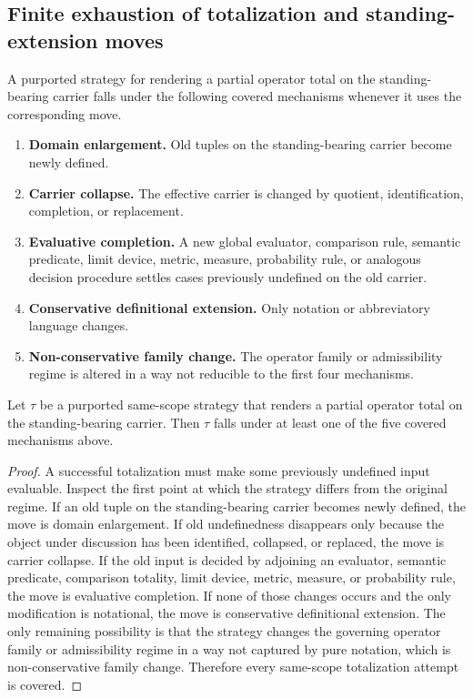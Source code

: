 \subsection{Finite exhaustion of totalization and standing-extension moves}

\begin{definition}
A purported strategy for rendering a partial operator total on the standing-bearing carrier falls under the following covered mechanisms whenever it uses the corresponding move.
\begin{enumerate}
  \item \textbf{Domain enlargement.} Old tuples on the standing-bearing carrier become newly defined.
  \item \textbf{Carrier collapse.} The effective carrier is changed by quotient, identification, completion, or replacement.
  \item \textbf{Evaluative completion.} A new global evaluator, comparison rule, semantic predicate, limit device, metric, measure, probability rule, or analogous decision procedure settles cases previously undefined on the old carrier.
  \item \textbf{Conservative definitional extension.} Only notation or abbreviatory language changes.
  \item \textbf{Non-conservative family change.} The operator family or admissibility regime is altered in a way not reducible to the first four mechanisms.
\end{enumerate}
\end{definition}

\begin{lemma}
\label{lem:finite-exhaustion-totalization-moves}
Let $\tau$ be a purported same-scope strategy that renders a partial operator total on the standing-bearing carrier. Then $\tau$ falls under at least one of the five covered mechanisms above.
\end{lemma}

\begin{proof}
A successful totalization must make some previously undefined input evaluable. Inspect the first point at which the strategy differs from the original regime. If an old tuple on the standing-bearing carrier becomes newly defined, the move is domain enlargement. If old undefinedness disappears only because the object under discussion has been identified, collapsed, or replaced, the move is carrier collapse. If the old input is decided by adjoining an evaluator, semantic predicate, comparison totality, limit device, metric, measure, or probability rule, the move is evaluative completion. If none of those changes occurs and the only modification is notational, the move is conservative definitional extension. The only remaining possibility is that the strategy changes the governing operator family or admissibility regime in a way not captured by pure notation, which is non-conservative family change. Therefore every same-scope totalization attempt is covered.
\end{proof}

